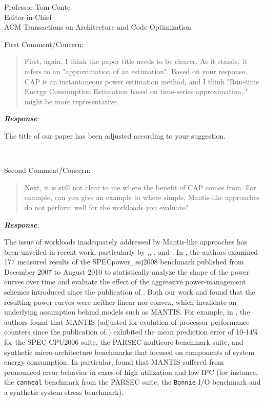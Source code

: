 \documentclass[10pt]{letter} %
\newenvironment{rviewcomment}
{~\\%
\begin{bfseries}}
{\end{bfseries}}
\newcommand{\rviewresponse}{\textbf{\textit{Response}}:}
\begin{document}
\begin{letter}{Professor Tom Conte \\
Editor-in-Chief \\
ACM Transactions on Architecture and Code Optimization }
\begin{rviewcomment}
  First Comment/Concern:
\end{rviewcomment}
\begin{quote}
\begin{itshape} 
  First, again, I think the paper title needs to be clearer. As it
  stands, it refers to an "approximation of an estimation". Based on
  your response, CAP is an instantaneous power estimation method, and I
  think "Run-time Energy Consumption Estimation based on time-series
  approximation.." might be more representative.
\end{itshape}
\end{quote}

\rviewresponse

The title of our paper has been adjusted according to your suggestion.

\begin{rviewcomment}
  Second Comment/Concern:
\end{rviewcomment}
\begin{quote}
  \begin{itshape}
    Next, it is still not clear to me where the benefit of CAP comes
    from. For example, can you give an example to where simple,
    Mantis-like approaches do not perform well for the workloads you
    evaluate? 
  \end{itshape}
\end{quote}
\rviewresponse 

The issue of workloads inadequately addressed by Mantis-like approaches
has been unveiled in recent work, particularly by
\cite{Varsampoulos2010},\cite{Kansal2010}, \cite{Hsu2011}, and
\cite{McCullough2011}. In \cite{Hsu2011}, the authors examined 177
measured results of the SPECpower\_ssj2008 benchmark published from
December 2007 to August 2010 to statistically analyze the shape of the
power curves over time and evaluate the effect of the aggressive
power-management schemes introduced since the publication of
\cite{Economou2006}. Both our work and \cite{Varsampoulos2010} found
that the resulting power curves were neither linear nor convex, which
invalidate an underlying assumption behind models such as MANTIS.  For
example, in \cite{McCullough2011}, the authors found that MANTIS
(adjusted for evolution of processor performance counters since the
publication of \cite{Economou2006}) exhibited the mean prediction error of
10-14\% for the SPEC CPU2006 suite, the PARSEC multicore benchmark
suite, and synthetic micro-architecture benchmarks that focused on
components of system energy consumption.  In particular, \cite{McCullough2011}
found that MANTIS suffered from pronounced error behavior in cases of
high utilization and low IPC (for instance, the \texttt{canneal}
benchmark from the PARSEC suite, the \texttt{Bonnie} I/O benchmark and a
synthetic system stress benchmark).


\end{letter}
\end{document}
